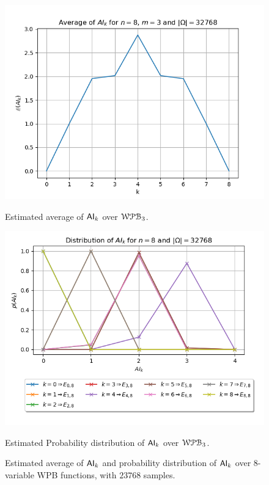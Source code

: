 \documentclass[11pt]{llncs}
\begin{document}



\begin{figure}[ht]
    \centering
    \begin{minipage}[b]{0.45\textwidth}
        \centering
        \includegraphics[width=\textwidth]{images/WPB_3_sample_size_32768_dist.png}
        \caption{Estimated average of $\mathsf{AI}_{k}$ over $\mathcal{WPB}_{3}$.}
        \label{fig:averages32768}
    \end{minipage}
    \hfill
    \begin{minipage}[b]{0.5\textwidth}
        \centering
        \includegraphics[width=\textwidth]{images/WPB_3.0_sample_size_32768_dist_prob_a.png}
        \caption{Estimated Probability distribution of $\mathsf{AI}_{k}$ over $\mathcal{WPB}_{3}$.}
        \label{fig:probDist32768}
    \end{minipage}
    \caption{Estimated average of $\mathsf{AI}_{k}$ and probability distribution of $\mathsf{AI}_{k}$ over $8$-variable WPB functions, with $23768$ samples.}
    \label{fig:main2}
\end{figure}
\end{document}

